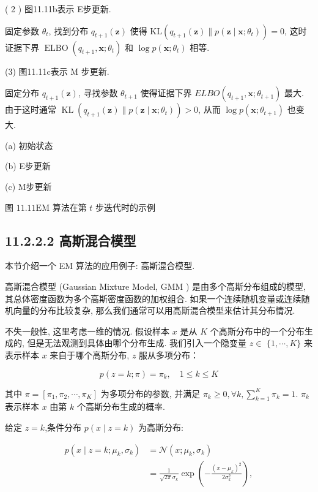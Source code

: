 \documentclass[10pt]{article}
\begin{document}
( 2 ) 图11.11b表示 E步更新.

固定参数 $\theta_{t}$, 找到分布 $q_{t+1}(\boldsymbol{z})$ 使得 $\mathrm{KL}\left(q_{t+1}(\boldsymbol{z}) \| p\left(\boldsymbol{z} \mid \boldsymbol{x} ; \theta_{t}\right)\right)=0$, 这时证据下界 $\operatorname{ELBO}\left(q_{t+1}, \boldsymbol{x} ; \theta_{t}\right)$ 和 $\log p\left(\boldsymbol{x} ; \theta_{t}\right)$ 相等.

(3) 图11.11c表示 M 步更新.

固定分布 $q_{t+1}(\boldsymbol{z})$, 寻找参数 $\theta_{t+1}$ 使得证据下界 $E L B O\left(q_{t+1}, \boldsymbol{x} ; \theta_{t+1}\right)$ 最大. 由于这时通常 $\operatorname{KL}\left(q_{t+1}(\boldsymbol{z}) \| p\left(\boldsymbol{z} \mid \boldsymbol{x} ; \theta_{t}\right)\right)>0$, 从而 $\log p\left(\boldsymbol{x} ; \theta_{t+1}\right)$ 也变大.



(a) 初始状态



(b) E步更新



(c) M步更新

图 $11.11 \mathrm{EM}$ 算法在第 $t$ 步迭代时的示例

\subsection*{11.2.2.2 高斯混合模型}
本节介绍一个 EM 算法的应用例子: 高斯混合模型.

高斯混合模型 (Gaussian Mixture Model, GMM ) 是由多个高斯分布组成的模型, 其总体密度函数为多个高斯密度函数的加权组合. 如果一个连续随机变量或连续随机向量的分布比较复杂, 那么我们通常可以用高斯混合模型来估计其分布情况.

不失一般性, 这里考虑一维的情况. 假设样本 $x$ 是从 $K$ 个高斯分布中的一个分布生成的, 但是无法观测到具体由哪个分布生成. 我们引入一个隐变量 $z \in$ $\{1, \cdots, K\}$ 来表示样本 $x$ 来自于哪个高斯分布, $z$ 服从多项分布：


\begin{equation*}
p(z=k ; \pi)=\pi_{k}, \quad 1 \leq k \leq K \tag{11.50}
\end{equation*}


其中 $\pi=\left[\pi_{1}, \pi_{2}, \cdots, \pi_{K}\right]$ 为多项分布的参数, 并满足 $\pi_{k} \geq 0, \forall k, \sum_{k=1}^{K} \pi_{k}=1$. $\pi_{k}$ 表示样本 $x$ 由第 $k$ 个高斯分布生成的概率.

给定 $z=k$,条件分布 $p(x \mid z=k)$ 为高斯分布:


\begin{align*}
p\left(x \mid z=k ; \mu_{k}, \sigma_{k}\right) & =\mathcal{N}\left(x ; \mu_{k}, \sigma_{k}\right)  \tag{11.51}\\
& =\frac{1}{\sqrt{2 \pi} \sigma_{k}} \exp \left(-\frac{\left(x-\mu_{k}\right)^{2}}{2 \sigma_{k}^{2}}\right), \tag{11.52}
\end{align*}
\end{document}
